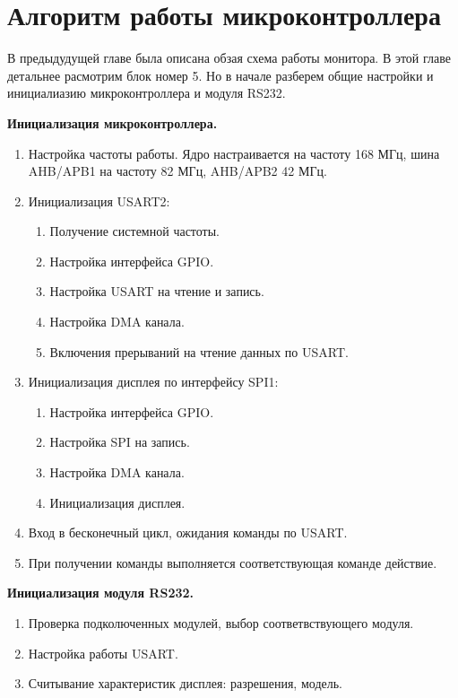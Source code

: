 \chapter{Алгоритм работы микроконтроллера}

	В предыдудущей главе была описана обзая схема работы монитора. В этой главе детальнее расмотрим блок номер 5. Но в начале разберем общие настройки и инициалиазию микроконтроллера и модуля RS232.
	
	\textbf{Инициализация микроконтроллера.}
	
	\begin{enumerate}
		\item Настройка частоты работы. Ядро настраивается на частоту 168 МГц, шина AHB/APB1 на частоту 82 МГц, AHB/APB2 42 МГц.
		\item Инициализация USART2:
		\begin{enumerate}
			\item Получение системной частоты.
			\item Настройка интерфейса GPIO.
			\item Настройка USART на чтение и запись.
			\item Настройка DMA канала.
			\item Включения прерываний на чтение данных по USART.
		\end{enumerate}
		\item Инициализация дисплея по интерфейсу SPI1:
		\begin{enumerate}
			\item Настройка интерфейса GPIO.
			\item Настройка SPI на запись.
			\item Настройка DMA канала.
			\item Инициализация дисплея.
		\end{enumerate}
		\item Вход в бесконечный цикл, ожидания команды по USART.
		\item При получении команды выполняется соответствующая команде действие.
	\end{enumerate}
	
	\textbf{Инициализация модуля RS232.}
	
	\begin{enumerate}
		\item Проверка подколюченных модулей, выбор соответвствующего модуля.
		\item Настройка работы USART.
		\item Считывание характеристик дисплея: разрешения, модель.
	\end{enumerate}
	

